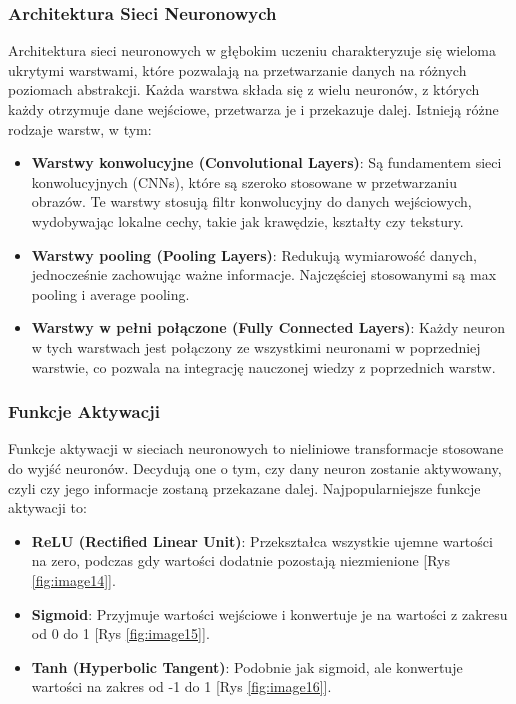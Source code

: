 \subsubsection*{Architektura Sieci Neuronowych}
Architektura sieci neuronowych w głębokim uczeniu charakteryzuje się wieloma ukrytymi warstwami, które pozwalają na przetwarzanie danych na różnych poziomach abstrakcji. Każda warstwa składa się z wielu neuronów, z których każdy otrzymuje dane wejściowe, przetwarza je i przekazuje dalej. Istnieją różne rodzaje warstw, w tym:
\begin{itemize}
    \item \textbf{Warstwy konwolucyjne (Convolutional Layers)}: Są fundamentem sieci konwolucyjnych (CNNs), które są szeroko stosowane w przetwarzaniu obrazów. Te warstwy stosują filtr konwolucyjny do danych wejściowych, wydobywając lokalne cechy, takie jak krawędzie, kształty czy tekstury.
    \item \textbf{Warstwy pooling (Pooling Layers)}: Redukują wymiarowość danych, jednocześnie zachowując ważne informacje. Najczęściej stosowanymi są max pooling i average pooling.
    \item \textbf{Warstwy w pełni połączone (Fully Connected Layers)}: Każdy neuron w tych warstwach jest połączony ze wszystkimi neuronami w poprzedniej warstwie, co pozwala na integrację nauczonej wiedzy z poprzednich warstw.
\end{itemize}


\subsubsection*{Funkcje Aktywacji}
Funkcje aktywacji w sieciach neuronowych to nieliniowe transformacje stosowane do wyjść neuronów. Decydują one o tym, czy dany neuron zostanie aktywowany, czyli czy jego informacje zostaną przekazane dalej. Najpopularniejsze funkcje aktywacji to:
\begin{itemize}
    \item \textbf{ReLU (Rectified Linear Unit)}: Przekształca wszystkie ujemne wartości na zero, podczas gdy wartości dodatnie pozostają niezmienione  [Rys \ref{fig:image14}].
    \item \textbf{Sigmoid}: Przyjmuje wartości wejściowe i konwertuje je na wartości z zakresu od 0 do 1 [Rys \ref{fig:image15}].
    \item \textbf{Tanh (Hyperbolic Tangent)}: Podobnie jak sigmoid, ale konwertuje wartości na zakres od -1 do 1 [Rys \ref{fig:image16}].
\end{itemize}

